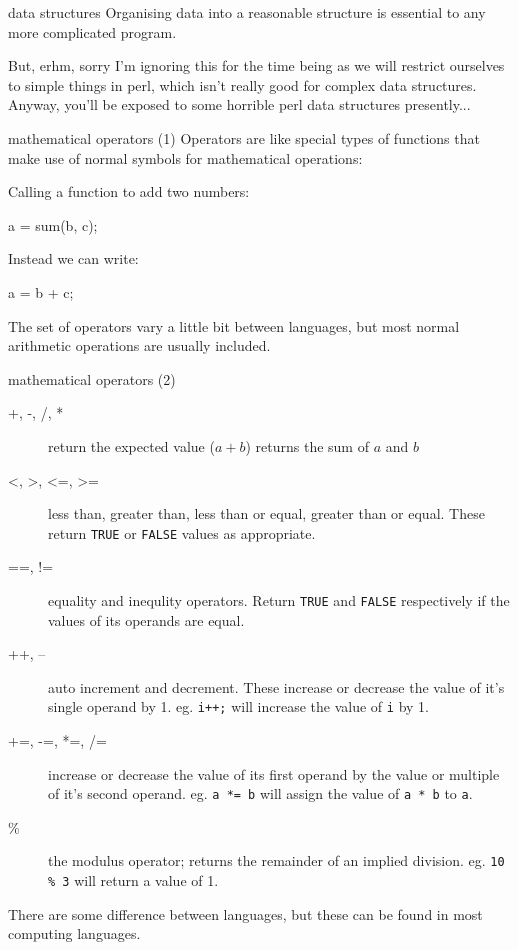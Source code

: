 \documentclass[pdf]{beamer}
\begin{document}
\begin{frame}[fragile]{data structures}
  Organising data into a reasonable structure is essential to any more
  complicated program.

  But, erhm, sorry I'm ignoring this for the time being as we will restrict ourselves to
  simple things in perl, which isn't really good for complex data
  structures. Anyway, you'll be exposed to some horrible perl data structures
  presently...

\end{frame}

\begin{frame}[fragile]{mathematical operators (1)}
  Operators are like special types of functions that make use of normal
  symbols for mathematical operations:

  Calling a function to add two numbers:
  \begin{cppcode}
    a = sum(b, c);
  \end{cppcode}

  Instead we can write:
  \begin{cppcode}
    a = b + c;
  \end{cppcode}

  The set of operators vary a little bit between languages, but most normal
  arithmetic operations are usually included.

\end{frame}

\begin{frame}[fragile]{mathematical operators (2)}
  \footnotesize{
  \begin{description}
    \item[+, -, /, *] return the expected value ($a + b$) returns the sum of $a$
      and $b$
    \item[\textless, \textgreater, \textless=, \textgreater=] less than, greater than, less than or equal, greater than
      or equal. These return \texttt{TRUE} or \texttt{FALSE} values as
      appropriate.
    \item[==, !=] equality and inequlity operators. Return \texttt{TRUE} and
      \texttt{FALSE} respectively if the values of its
      operands are equal.
    \item[++, --] auto increment and decrement. These increase or decrease the
      value of it's single operand by 1. eg. \texttt{i++;} will increase the
      value of \texttt{i} by 1.
    \item[+=, -=, *=, /=] increase or decrease the value of its first operand by
      the value or multiple of it's second operand. eg. \texttt{a *= b} will
      assign the value of \texttt{a * b} to \texttt{a}.
    \item[\%] the modulus operator; returns the remainder of an implied
      division. eg. \texttt{10 \% 3} will return a value of 1.
  \end{description}
  
  There are some difference between languages, but these can be found in most
  computing languages.
  }
\end{frame}
\end{document}
